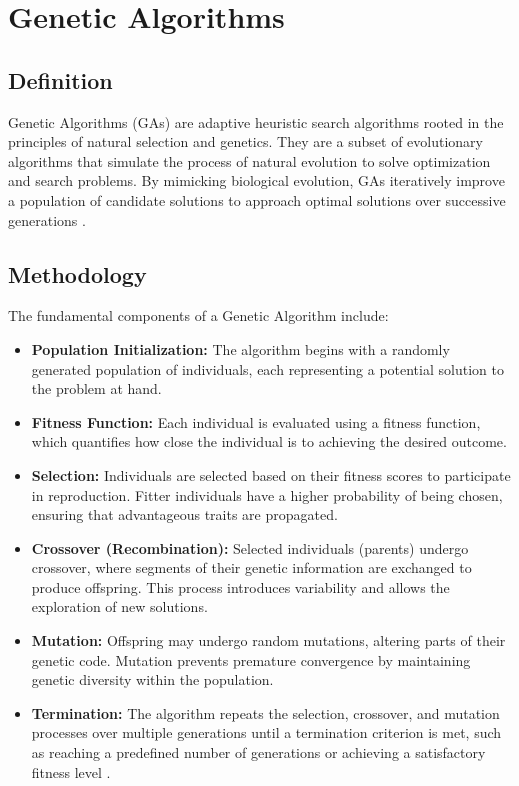 \section{Genetic Algorithms}

\subsection{Definition}

Genetic Algorithms (GAs) are adaptive heuristic search algorithms rooted in the principles of natural selection and genetics. They are a subset of evolutionary algorithms that simulate the process of natural evolution to solve optimization and search problems. By mimicking biological evolution, GAs iteratively improve a population of candidate solutions to approach optimal solutions over successive generations \cite{turn0search2}.

\subsection{Methodology}

The fundamental components of a Genetic Algorithm include:

\begin{itemize}
    \item \textbf{Population Initialization:} The algorithm begins with a randomly generated population of individuals, each representing a potential solution to the problem at hand.
    \item \textbf{Fitness Function:} Each individual is evaluated using a fitness function, which quantifies how close the individual is to achieving the desired outcome.
    \item \textbf{Selection:} Individuals are selected based on their fitness scores to participate in reproduction. Fitter individuals have a higher probability of being chosen, ensuring that advantageous traits are propagated.
    \item \textbf{Crossover (Recombination):} Selected individuals (parents) undergo crossover, where segments of their genetic information are exchanged to produce offspring. This process introduces variability and allows the exploration of new solutions.
    \item \textbf{Mutation:} Offspring may undergo random mutations, altering parts of their genetic code. Mutation prevents premature convergence by maintaining genetic diversity within the population.
    \item \textbf{Termination:} The algorithm repeats the selection, crossover, and mutation processes over multiple generations until a termination criterion is met, such as reaching a predefined number of generations or achieving a satisfactory fitness level \cite{turn0search2}.
\end{itemize}

